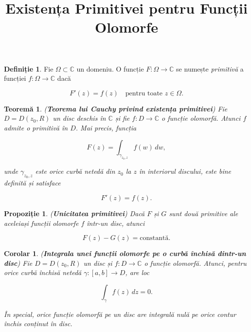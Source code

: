 \documentclass[12pt]{article}
\title{Existența Primitivei pentru Funcții Olomorfe}
\author{}
\date{}
\theoremstyle{definition}
\newtheorem{definition}{Definiție}
\theoremstyle{plain}
\newtheorem{theorem}{Teoremă}
\newtheorem{proposition}{Propoziție}
\newtheorem{corollary}{Corolar}
\begin{document}
\maketitle

\begin{definition}
Fie $\Omega \subset \mathbb{C}$ un domeniu.  
O funcție $F:\Omega \to \mathbb{C}$ se numește \emph{primitivă} a funcției $f:\Omega \to \mathbb{C}$ dacă


\[
F'(z) = f(z) \quad \text{pentru toate } z \in \Omega.
\]


\end{definition}

\begin{theorem}
(\textbf{Teorema lui Cauchy privind existența primitivei})  
Fie $D = D(z_0, R)$ un disc deschis în $\mathbb{C}$ și fie $f : D \to \mathbb{C}$ o funcție olomorfă.  
Atunci $f$ admite o primitivă în $D$.  
Mai precis, funcția


\[
F(z) = \int_{\gamma_{z_0,z}} f(w)\,dw,
\]


unde $\gamma_{z_0,z}$ este orice curbă netedă din $z_0$ la $z$ în interiorul discului, este bine definită și satisface


\[
F'(z) = f(z).
\]


\end{theorem}

\begin{proposition}
(\textbf{Unicitatea primitivei})  
Dacă $F$ și $G$ sunt două primitive ale aceleiași funcții olomorfe $f$ într-un disc, atunci


\[
F(z) - G(z) = \text{constantă}.
\]


\end{proposition}

\begin{corollary}
(\textbf{Integrala unei funcții olomorfe pe o curbă închisă dintr-un disc})  
Fie $D = D(z_0, R)$ un disc și $f : D \to \mathbb{C}$ o funcție olomorfă.  
Atunci, pentru orice curbă închisă netedă $\gamma : [a,b] \to D$, are loc


\[
\int_{\gamma} f(z)\,dz = 0.
\]


\textit{În special, orice funcție olomorfă pe un disc are integrală nulă pe orice contur închis conținut în disc.}
\end{corollary}
\end{document}

